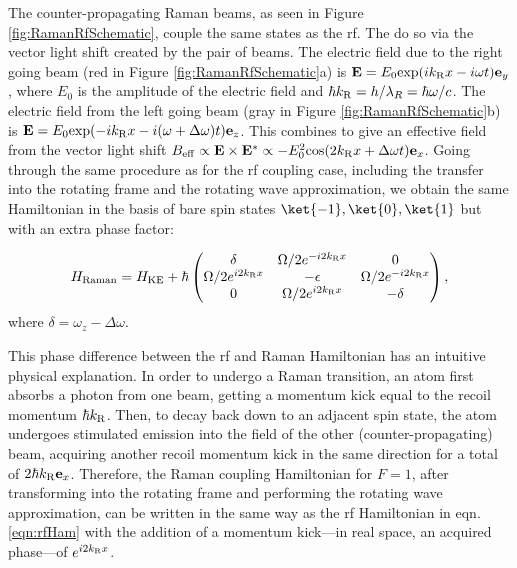 	The counter-propagating Raman beams, as seen in Figure \ref{fig:RamanRfSchematic}, couple the same states as the rf. The do so via the vector light shift created by the pair of beams. The electric field due to the right going beam (red in Figure \ref{fig:RamanRfSchematic}a) is $\mathbf{E} = E_0 {\rm exp}(i k_{\rm R} x - i\omega t) \mathbf{e}_y$, where $E_0$ is the amplitude of the electric field and $\hbar k_{\rm R} = h/\lambda_R=\hbar\omega/c$. The electric field from the left going beam (gray in Figure \ref{fig:RamanRfSchematic}b) is $\mathbf{E} = E_0 {\rm exp}(-i k_{\rm R} x - i(\omega +\Delta \omega)t) \mathbf{e}_z$. This combines to give an effective field from the vector light shift\cite{SteckTextbook} $B_{\rm eff}\propto \mathbf{E}\times\mathbf{E^*} \propto -E^2_0 {\rm cos}(2k_{\rm R} x + \Delta\omega t)\mathbf{e}_x$. Going through the same procedure as for the rf coupling case, including the  transfer into the rotating frame and the rotating wave approximation, we obtain the same Hamiltonian in the basis of bare spin states $\ket{-1},\ket{0},\ket{1}$ but with an extra phase factor:
	 
\begin{equation}
H_{\rm Raman} = H_{\rm KE} + \hbar
 \begin{pmatrix} \delta & \Omega/2 e^{-i 2 k_{\rm R} x}  &  0  \\ 
\Omega/2 e^{i 2 k_{\rm R} x} & -\epsilon &  \Omega/2 e^{-i 2 k_{\rm R} x}\\
 0 & \Omega/2 e^{i 2 k_{\rm R} x} & -\delta  \\
 \end{pmatrix} \\,
\end{equation}
where $\delta = \omega_z - \Delta\omega$.

	This phase difference between the rf and Raman Hamiltonian has an intuitive physical explanation. In order to undergo a Raman transition, an atom first absorbs a photon from one beam, getting a momentum kick equal to the recoil momentum $\hbar k_{\rm R}$. Then, to decay back down to an adjacent spin state, the atom undergoes stimulated emission into the field of the other (counter-propagating) beam, acquiring another recoil momentum kick in the same direction for a total of $2\hbar k_{\rm R} \mathbf{e}_x$. Therefore, the Raman coupling Hamiltonian for $F=1$, after transforming into the rotating frame and performing the rotating wave approximation, can be written in the same way as the rf Hamiltonian in eqn. \ref{eqn:rfHam} with the addition of a momentum kick---in real space, an acquired phase---of $e^{i 2 k_{\rm R} x}$.

